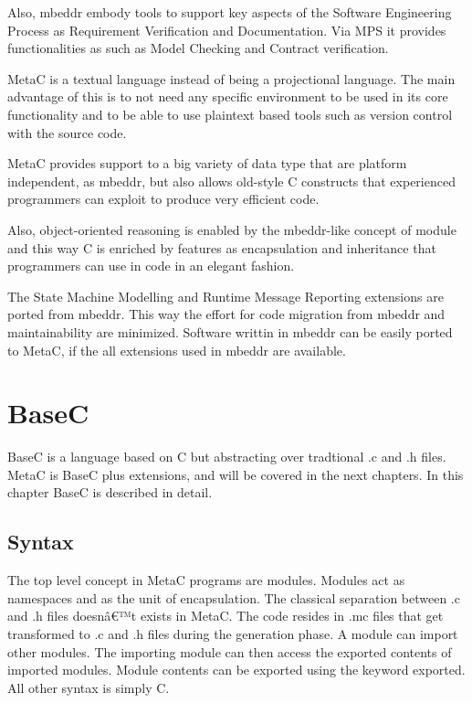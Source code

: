 \documentclass[a4paper,10pt,titlepage]{report}
\begin{document}
Also, mbeddr embody tools to support key aspects of the Software Engineering Process as Requirement Verification and Documentation. Via MPS it provides functionalities as such as Model Checking and Contract verification.

MetaC is a textual language instead of being a projectional language. The main advantage of this is to not need any specific environment to be used in its core functionality and to be able to use plaintext based tools such as version control with the source code. 

MetaC provides support to a big variety of data type that are platform independent, as mbeddr, but also allows old-style C constructs that experienced programmers can exploit to produce very efficient code.

Also, object-oriented reasoning is enabled by the mbeddr-like concept of module and this way C is enriched by features as encapsulation and inheritance that programmers can use in code in an elegant fashion.

The State Machine Modelling and Runtime Message Reporting extensions are ported from mbeddr. This way the effort for code migration from mbeddr and maintainability are minimized. Software writtin in mbeddr can be easily ported to MetaC, if the all extensions used in mbeddr are available.


\chapter{BaseC}

BaseC is a language based on C but abstracting over tradtional .c and .h files. 
MetaC is BaseC plus extensions, and will be covered in the next chapters. In this chapter BaseC is described in detail. 

\section{Syntax}

The top level concept in MetaC programs are modules. Modules act as namespaces and as the unit of encapsulation. The classical separation between .c and .h files doesnâ€™t exists in MetaC. The code resides in .mc files that get transformed to .c and .h files during the generation phase. 
A module can import other modules. The importing module can then access the exported contents of imported modules. Module contents can be exported using the keyword exported. All other syntax is simply C.
\end{document}

